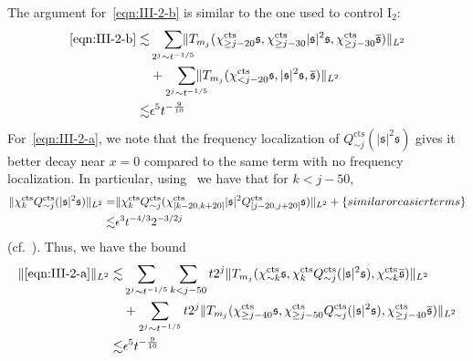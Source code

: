 \documentclass[letterpaper, reqno,final]{amsart}
\newcommand{\fs}{\mathfrak{s}}
\newcommand{\rmI}{\mathrm{I}}
\newcommand{\tcts}{\text{cts}}
\newcommand{\btext}[1]{\left\{\textup{#1}\right\}}
\newcommand{\bsime}{\btext{similar or easier terms}}
\begin{document}
The argument for~\eqref{eqn:III-2-b} is similar to the one used to control $\rmI_2$:
\begin{equation*}\begin{split}
    \eqref{eqn:III-2-b} \lesssim& \smashoperator[r]{\sum_{2^j \sim t^{-1/5}}} \lVert T_{m_j}(\chi_{\geq j - 20}^\tcts \fs, \chi_{\geq j - 30}^\tcts |\fs|^2\fs, \chi_{\geq j - 30}^\tcts \overline{\fs}) \rVert_{L^2}\\
    &+ \smashoperator[r]{\sum_{2^j \sim t^{-1/5}}} \lVert T_{m_j}(\chi_{< j - 20}^\tcts \fs, |\fs|^2\fs,\overline{\fs}) \rVert_{L^2}\\
    \lesssim& \epsilon^5 t^{-\frac{9}{10}}
\end{split}
\end{equation*}
For~\eqref{eqn:III-2-a}, we note that the frequency localization of $Q_{\sim j}^\tcts(|\fs|^2\fs)$ gives it better decay near $x = 0$ compared to the same term with no frequency localization.  In particular, using~ we have that for $k < j - 50$,
\begin{equation*}\begin{split}
    \lVert \chi_{k}^\tcts Q_{\sim j}^\tcts(|\fs|^2\fs) \rVert_{L^2} =& \lVert \chi_{k}^\tcts Q_{\sim j}^\tcts( \chi_{[k-20, k+20]}^\tcts |\fs|^2Q_{[j - 20, j + 20]}^\tcts\fs)\rVert_{L^2} +\bsime \\
    \lesssim& \epsilon^3 t^{-4/3} 2^{-3/2j}
\end{split}\end{equation*}
(cf.~\cite[Section 3.2]{stewartLongTimeDecay2021}).  Thus, we have the bound
\begin{equation*}\begin{split}
    \lVert \eqref{eqn:III-2-a} \rVert_{L^2} \lesssim& \sum_{2^j \sim t^{-1/5}} \sum_{k < j - 50} t 2^j \lVert T_{m_j}(\chi_{\sim k}^\tcts \fs, \chi_{k}^\tcts Q_{\sim j}^\tcts(|\fs|^2\fs), \chi_{\sim k}^\tcts \overline{\fs}) \rVert_{L^2}\\
    &+ \sum_{2^j \sim t^{-1/5}} t 2^j \lVert T_{m_j}(\chi_{\geq j - 40}^\tcts \fs, \chi_{\geq j - 50}^\tcts Q_{\sim j}^\tcts(|\fs|^2\fs), \chi_{\geq j - 40}^\tcts \overline{\fs}) \rVert_{L^2}\\
    \lesssim& \epsilon^5 t^{-\frac{9}{10}}
\end{split}
\end{equation*}
\end{document}
